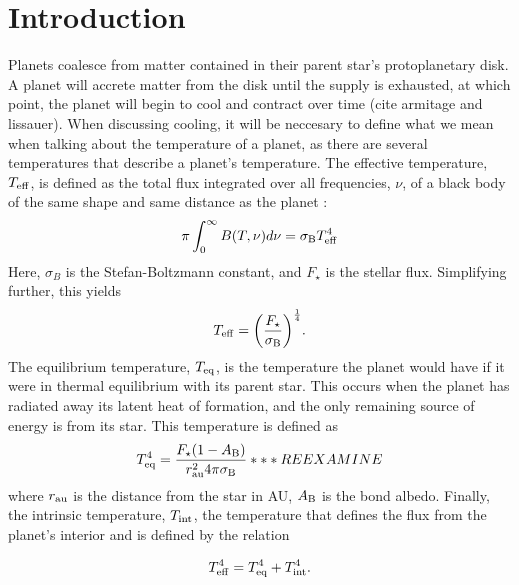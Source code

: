 \documentclass[11pt]{ucscthesisbs}
\begin{document}

\chapter{Introduction}
Planets coalesce from matter contained in their parent star's protoplanetary disk. A planet will accrete matter from the disk until the supply is exhausted, at which point, the planet will begin to cool and contract over time (cite armitage and lissauer). When discussing cooling, it will be neccesary to define what we mean when talking about the temperature of a planet, as there are several temperatures that describe a planet's temperature.  The effective temperature, $T_{\rm eff}$, is defined as the total flux integrated over all frequencies, $\nu$, of a black body of the same shape and same distance as the planet \citep{seager_2010}:
\begin{equation}
    \pi \int_{0}^{\infty} B(T, \nu) d\nu = \sigma_{\rm B}T_{\rm eff}^{4}
  \label{eq:effective_temp_integral}
\end{equation}  
Here, $\sigma_{B}$ is the Stefan-Boltzmann constant, and $F_{\star}$ is the stellar flux. Simplifying further, this yields
\begin{equation}
    T_{\rm eff} = \bigg(\frac{F_{\star}}{\sigma_{\rm B}}\bigg)^{\frac{1}{4}}.
  \label{eq:effective_temp}
\end{equation}
The equilibrium temperature, $T_{\rm eq}$, is the temperature the planet would have if it were in thermal equilibrium with its parent star. This occurs when the planet has radiated away its latent heat of formation, and the only remaining source of energy is from its star. This temperature is defined as
\begin{equation}
    T_{\rm eq}^4 = \frac{F_{\star}(1-A_{\rm B})}{r_{\rm au}^{2} 4 \pi \sigma_{\rm B}} *** REEXAMINE
  \label{eq:equilibrium_temp}
\end{equation} 
where $r_{\rm au}$ is the distance from the star in AU, $A_{\rm B}$ is the bond albedo. Finally, the intrinsic temperature, $T_{\rm int}$, the temperature that defines the flux from the planet's interior and is defined by the relation

\begin{equation}
    T_{\rm eff}^4 =  T_{\rm eq}^4 +  T_{\rm int}^4.
  \label{eq:effective_temp}
\end{equation} 
\end{document}
